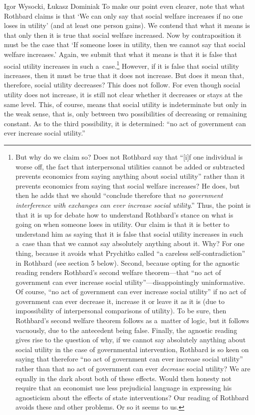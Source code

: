 \begin{artengenv}{Igor Wysocki, Łukasz Dominiak}
To make our point even clearer, note that what Rothbard claims is that ‘We can only say that social welfare increases if no one loses in utility' (and at least one person gains). We contend that what it means is that only then it is true that social welfare increased. Now by contraposition it must be the case that ‘If someone loses in utility, then we cannot say that social welfare increases.' Again, we submit that what it means is that it is false that social utility increases in such a~case.\footnote{But why do we claim so? Does not Rothbard say that ``[i]f one individual is worse off, the fact that interpersonal utilities cannot be added or subtracted prevents economics from saying anything about social utility'' rather than it prevents economics from saying that social welfare increases? He does, but then he adds that we should ``conclude therefore that \textit{no government interference with exchanges can ever increase social utility}.'' Thus, the point is that it is up for debate how to understand Rothbard's stance on what is going on when someone loses in utility. Our claim is that it is better to understand him as saying that it is false that social utility increases in such a~case than that we cannot say absolutely anything about it. Why? For one thing, because it avoids what Prychitko called ``a careless self-contradiction'' in Rothbard (see section 5 below). Second, because opting for the agnostic reading renders Rothbard's second welfare theorem---that ``no act of government can ever increase social utility''---disappointingly uninformative. Of course, ``no act of government can ever increase social utility'' if no act of government can ever decrease it, increase it or leave it as it is (due to impossibility of interpersonal comparisons of utility). To be sure, then Rothbard's second welfare theorem follows as a~matter of logic, but it follows vacuously, due to the antecedent being false. Finally, the agnostic reading gives rise to the question of why, if we cannot say absolutely anything about social utility in the case of governmental intervention, Rothbard is so keen on saying that therefore ``no act of government can ever increase social utility'' rather than that no act of government can ever \textit{decrease} social utility? We are equally in the dark about both of these effects. Would then honesty not require that an economist use less prejudicial language in expressing his agnosticism about the effects of state interventions? Our reading of Rothbard avoids these and other problems. Or so it seems to us.} However, if it is false that social utility increases, then it must be true that it does not increase. But does it mean that, therefore, social utility decreases? This does not follow. For even though social utility does not increase, it is still not clear whether it decreases or stays at the same level. This, of course, means that social utility is indeterminate but only in the weak sense, that is, only between two possibilities of decreasing or remaining constant. As to the third possibility, it is determined: ``no act of government can ever increase social utility.'' 

\end{artengenv}
